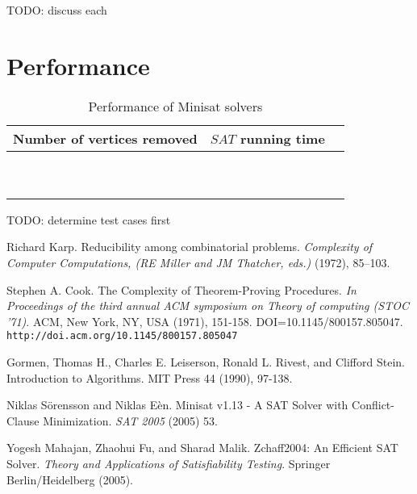 \documentclass[paper=a4, fontsize=11pt]{scrartcl} %
\begin{document}
{\color{red} TODO}: discuss each 

\section{Performance}
\begin{table}
	\caption{Performance of Minisat solvers}
	\begin{tabular}{|l|l|l|}
		\hline
		Number of vertices removed & $SAT$ running time \\ \hline
		~ & ~ \\ 
		~ & ~ \\
		\hline
	\end{tabular}
	\label{tab:performanceSat}
\end{table}


{\color{red} TODO}: determine test cases first


\begin{thebibliography}{9}

 Richard Karp. Reducibility among combinatorial problems. \emph{Complexity of Computer Computations, (RE Miller and JM Thatcher, eds.)} (1972), 85–103.

 Stephen A. Cook. The Complexity of Theorem-Proving Procedures. \emph{In Proceedings of the third annual ACM symposium on Theory of computing (STOC '71)}. ACM, New York, NY, USA (1971), 151-158. DOI=10.1145/800157.805047. {\tt http://doi.acm.org/10.1145/800157.805047}

 Gormen, Thomas H., Charles E. Leiserson, Ronald L. Rivest, and Clifford Stein. Introduction to Algorithms. MIT Press 44 (1990), 97-138.

 Niklas S\"{o}rensson and Niklas E\`{e}n. Minisat v1.13 - A SAT Solver with Conflict-Clause Minimization. \emph{SAT 2005} (2005) 53.

 Yogesh Mahajan, Zhaohui Fu, and Sharad Malik. Zchaff2004: An Efficient SAT Solver. \emph{Theory and Applications of Satisfiability Testing}. Springer Berlin/Heidelberg (2005).

\end{thebibliography}
\end{document}
